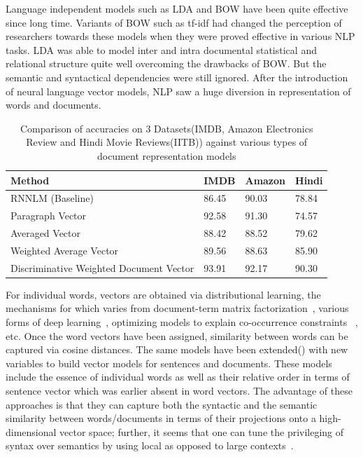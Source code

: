 \documentclass[11pt,a4paper]{article}
\begin{document}
Language independent models such as LDA  and BOW have been quite effective since long time. Variants of BOW such as tf-idf had changed the perception of researchers towards these models when they were proved effective in various NLP tasks. LDA was able to model inter and intra documental statistical and relational structure quite well overcoming the drawbacks of BOW. But the semantic and syntactical dependencies were still ignored. After the introduction of neural language vector models, NLP saw a huge diversion in representation of words and documents.
\begin{table}[h]
\centering
\small
\begin{tabular}{|p{3.2cm}|l|l|l|}
\hline
\textbf{Method}                                                             & \textbf{IMDB}  & \textbf{Amazon} & \textbf{Hindi} \\ \hline
RNNLM (Baseline)                                               & 86.45          & 90.03           & 78.84          \\ \hline
Paragraph Vector \cite{Le:14}                                               & 92.58          & 91.30           & 74.57          \\ \hline
Averaged Vector                                                             & 88.42          & 88.52           & 79.62          \\ \hline
Weighted Average Vector                                                            & 89.56          & 88.63               & 85.90          \\ \hline
Discriminative Weighted Document Vector                                     & 93.91          & 92.17               & 90.30         \\ \hline
\end{tabular}
\caption {Comparison of accuracies on 3 Datasets(IMDB, Amazon Electronics Review and Hindi Movie Reviews(IITB)) against various types of document representation models}
\label{table:3Datasets}
\end{table}
For individual words, vectors are obtained via distributional learning, the mechanisms for which varies from document-term matrix factorization~\cite{Landauer:97}, various forms of deep learning~\cite{Collobert:08,Turian:10,Socher:13}, optimizing models to explain co-occurrence constraints ~\cite{Mikolov:13a,Pennington:14}, etc. Once the word vectors have been assigned, similarity between words can be captured via cosine distances. The same models have been extended(\cite{Le:14}) with new variables to build vector models for sentences and documents. These models include the essence of individual words as well as their relative order in terms of sentence vector which was earlier absent in word vectors. The advantage of these approaches is that they can capture both the syntactic and the semantic similarity between words/documents in terms of their projections onto a high-dimensional vector space; further, it seems that one can tune the privileging of syntax over semantics by using local as opposed to large contexts~\cite{Huang:12}.
\end{document}
